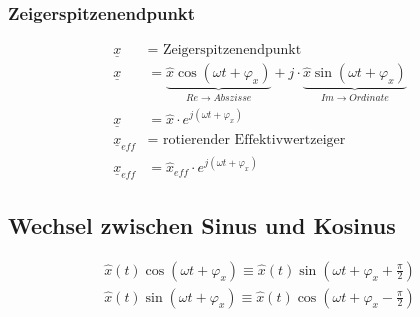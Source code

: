 \subsubsection*{Zeigerspitzenendpunkt}
\begin{align*}
\underline{x} &= \text{ Zeigerspitzenendpunkt}\\
\underline{x} &= \underbrace{\hat{x}\cos\left(\omega t + \varphi_{x}\right)}_{Re \rightarrow Abszisse} + j \cdot
\underbrace{\hat{x}\sin\left(\omega t + \varphi_{x}\right)}_{Im \rightarrow Ordinate} \\
\underline{x} &= \hat{x} \cdot e^{j \left( \omega t + \varphi_x \right)} \\
\underline{x}_{eff} &= \text{ rotierender Effektivwertzeiger} \\
\underline{x}_{eff} &= \hat{x}_{eff} \cdot e^{j \left( \omega t + \varphi_x \right)} 
\end{align*}

\subsection*{Wechsel zwischen Sinus und Kosinus}
\begin{align*}
\hat{x}\left(t\right)\cos\left(\omega t + \varphi_x\right) \equiv \hat{x}\left(t\right)\sin\left(\omega t + \varphi_x + \frac{\pi}{2}\right) \\
\hat{x}\left(t\right)\sin\left(\omega t + \varphi_x\right) \equiv \hat{x}\left(t\right)\cos\left(\omega t + \varphi_x - \frac{\pi}{2}\right)
\end{align*}

